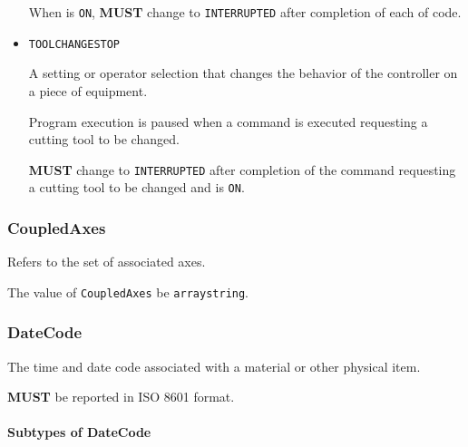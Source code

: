 \begin{itemize}
 When  is \texttt{ON},  \textbf{MUST} change to \texttt{INTERRUPTED} after completion of each  of code. 

\item \texttt{TOOL\textunderscore CHANGE\textunderscore STOP}


A setting or operator selection that changes the behavior of the controller on a piece of equipment.  

Program execution is paused when a command is executed requesting a cutting tool to be changed. 

 \textbf{MUST} change to \texttt{INTERRUPTED} after completion of the command requesting a cutting tool to be changed and  is \texttt{ON}.


\end{itemize}








\subsubsection{CoupledAxes}
\label{sec:CoupledAxes}



Refers to the set of associated axes.


The value of \texttt{CoupledAxes} \MUST be \texttt{arraystring}.



\subsubsection{DateCode}
\label{sec:DateCode}



The time and date code associated with a material or other physical item.
  
  \textbf{MUST} be reported in ISO 8601 format.


\paragraph{Subtypes of DateCode}\mbox{}
\label{sec:Subtypes of DateCode}

